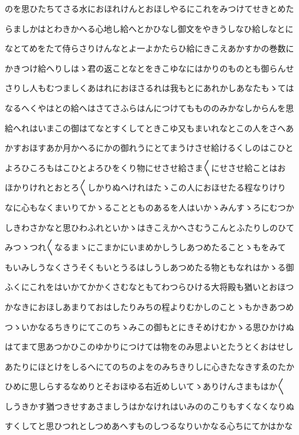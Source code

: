 \documentclass[a4paper,11pt,landscape]{ltjtarticle}
\begin{document}
のを思ひたちてさる水におほれけんとおほしやるにこれをみつけてせきとめた
\par\medskip
らましかはとわきかへる心地し給へとかひなし御文をやきうしなひ給しなとに
\par\medskip
なとてめをたて侍らさりけんなとよ一よかたらひ給にきこえあかすかの巻数に
\par\medskip
かきつけ給へりしはゝ君の返ことなとをきこゆなにはかりのものとも御らんせ
\par\medskip
さりし人もむつましくあはれにおほさるれは我もとにあれかしあなたもゝては
\par\medskip
なるへくやはとの給へはさてさふらはんにつけてももののみかなしからんを思
\par\medskip
給へれはいまこの御はてなとすくしてときこゆ又もまいれなとこの人をさへあ
\par\medskip
かすおほすあか月かへるにかの御れうにとてまうけさせ給けるくしのはこひと
\par\medskip
よろひころもはこひとよろひをくり物にせさせ給さま〱にせさせ給ことはお
\par\medskip
ほかりけれとおとろ〱しかりぬへけれはたゝこの人におほせたる程なりけり
\par\medskip
なに心もなくまいりてかゝることとものあるを人はいかゝみんすゝろにむつか
\par\medskip
しきわさかなと思ひわふれといかゝはきこえかへさむうこんとふたりしのひて
\par\medskip
みつゝつれ〱なるまゝにこまかにいまめかしうしあつめたることゝもをみて
\par\medskip
もいみしうなくさうそくもいとうるはしうしあつめたる物ともなれはかゝる御
\par\medskip
ふくにこれをはいかてかかくさむなともてわつらひける大将殿も猶いとおほつ
\par\medskip
かなきにおほしあまりておはしたりみちの程よりむかしのことゝもかきあつめ
\par\medskip
つゝいかなるちきりにてこのちゝみこの御もとにきそめけむかゝる思ひかけぬ
\par\medskip
はてまて思あつかひこのゆかりにつけては物をのみ思よいとたうとくおはせし
\par\medskip
あたりにほとけをしるへにてのちのよをのみちきりしに心きたなきすゑのたか
\par\medskip
ひめに思しらするなめりとそおほゆる右近めしいてゝありけんさまもはか〱
\par\medskip
しうきかす猶つきせすあさましうはかなけれはいみののこりもすくなくなりぬ
\par\medskip
すくしてと思ひつれとしつめあへすものしつるなりいかなる心ちにてかはかな
\end{document}
